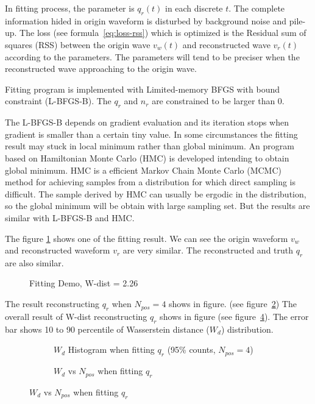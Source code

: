 In fitting process, the parameter is $q_{r}(t)$ in each discrete $t$. The complete information hided in origin waveform is disturbed by background noise and pile-up. The loss (see formula~\ref{eq:loss-rss}) which is optimized is the Residual sum of squares (RSS) between the origin wave $v_{w}(t)$ and reconstructed wave $v_{r}(t)$ according to the parameters. The parameters will tend to be preciser when the reconstructed wave approaching to the origin wave. 

Fitting program is implemented with Limited-memory BFGS with bound constraint\cite{byrd_limited_1995} (L-BFGS-B). The $q_{r}$ and $n_{r}$ are constrained to be larger than 0. 

The L-BFGS-B depends on gradient evaluation and its iteration stops when gradient is smaller than a certain tiny value. In some circumstances the fitting result may stuck in local minimum rather than global minimum. An program based on Hamiltonian Monte Carlo (HMC) is developed intending to obtain global minimum. HMC is a efficient Markov Chain Monte Carlo (MCMC) method for achieving samples from a distribution for which direct sampling is difficult\cite{neal_mcmc_2012}. The sample derived by HMC can usually be ergodic in the distribution, so the global minimum will be obtain with large sampling set. But the results are similar with L-BFGS-B and HMC. 

The figure \ref{fig:fitting} shows one of the fitting result. We can see the origin waveform $v_{w}$ and reconstructed waveform $v_{r}$ are very similar. The reconstructed and truth $q_{r}$ are also similar. 
\begin{figure}[H]
    \centering
    \scalebox{0.4}{}
    \caption{\label{fig:fitting} Fitting Demo, W-dist = 2.26}
\end{figure}

The result reconstructing $q_{r}$ when $N_{pos}=4$ shows in figure. (see figure~\ref{fig:fitting-hist}) The overall result of W-dist reconstructing $q_{r}$ shows in figure (see figure~\ref{fig:fitting-npos}). The error bar shows 10 to 90 percentile of Wasserstein distance ($W_{d}$) distribution. 

\begin{figure}[H]
\begin{minipage}[t]{.5\textwidth}
\begin{figure}[H]
    \centering
    \resizebox{\textwidth}{!}{}
    \caption{\label{fig:fitting-hist} $W_{d}$ Histogram when fitting $q_{r}$ (95\% counts, $N_{pos}=4$)}
\end{figure}
\end{minipage}
\begin{minipage}[t]{.5\textwidth}
\begin{figure}[H]
    \centering
    \resizebox{\textwidth}{!}{}
    \caption{\label{fig:fitting-npos} $W_{d}$ vs $N_{pos}$ when fitting $q_{r}$}
\end{figure}
\end{minipage}
\end{figure}

